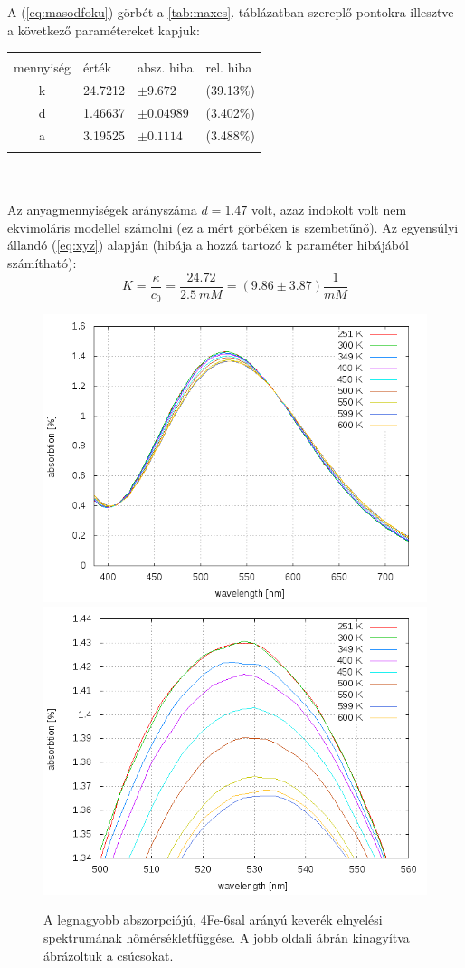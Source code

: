 \documentclass[20pt]{article}
\numberwithin{equation}{section}
\numberwithin{figure}{section}
\numberwithin{table}{section}
\begin{document}
	A (\ref{eq:masodfoku}) görbét a \ref{tab:maxes}. táblázatban szereplő pontokra illesztve a következő paramétereket kapjuk:\\
	\begin{tabular}{clll}
		&&&\\
		mennyiség&érték&absz. hiba&rel. hiba\\ [5pt]
		k&24.7212&$\pm 9.672$&(39.13\%)\\
		d&1.46637&$\pm 0.04989$&(3.402\%)\\
		a&3.19525&$\pm 0.1114$&(3.488\%)\\
		&&&\\
	\end{tabular}\\
	\\
	Az anyagmennyiségek arányszáma $d = 1.47$ volt, azaz indokolt volt nem ekvimoláris modellel számolni (ez a mért görbéken is szembetűnő). Az egyensúlyi állandó (\ref{eq:xyz}) alapján (hibája a hozzá tartozó k paraméter hibájából számítható):
	\begin{equation}
	K = \frac{\kappa}{c_0} = \frac{24.72}{2.5\ mM} = (9.86 \pm 3.87) \frac{1}{mM}
	\end{equation}
	\begin{figure}[h!]
		\centering
		\includegraphics[width=.49\textwidth]{homersekletfugges.png}
		\includegraphics[width=.49\textwidth]{homersekletfuggeszoom.png}
		\caption[Elnyelés hőmérsékletfüggése]{A legnagyobb abszorpciójú, 4Fe-6sal arányú keverék elnyelési spektrumának hőmérsékletfüggése. A jobb oldali ábrán kinagyítva ábrázoltuk a csúcsokat.\label{fig:homfugges}}
	\end{figure}
\end{document}
